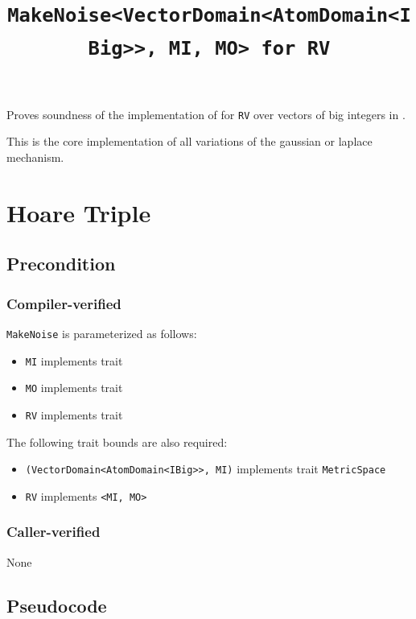 \documentclass{article}
\title{\texttt{MakeNoise<VectorDomain<AtomDomain<IBig>>, MI, MO> for RV}}
\author{\MichaelShoemateAuthor}
\date{}
\begin{document}
\maketitle

\contrib
Proves soundness of the implementation of 
for \texttt{RV} over vectors of big integers in .

This is the core implementation of all variations of the gaussian or laplace mechanism.

\section{Hoare Triple}
\subsection*{Precondition}
\subsubsection*{Compiler-verified}
\texttt{MakeNoise} is parameterized as follows:
\begin{itemize}
    \item \texttt{MI} implements trait 
    \item \texttt{MO} implements trait 
    \item \texttt{RV} implements trait 
\end{itemize}

The following trait bounds are also required:
\begin{itemize}
    \item \texttt{(VectorDomain<AtomDomain<IBig>{}>, MI)} implements trait \texttt{MetricSpace}
    \item \texttt{RV} implements \texttt{<MI, MO>}
\end{itemize}

\subsubsection*{Caller-verified}
None

\subsection*{Pseudocode}

\end{document}
